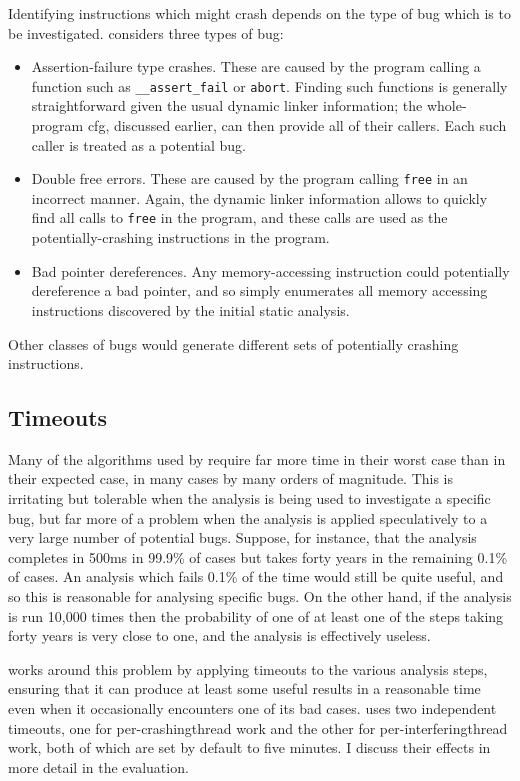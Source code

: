 Identifying instructions which might crash depends on the type of bug
which is to be investigated.  {\Implementation} considers three types
of bug:
\begin{itemize}
\item Assertion-failure type crashes.  These are caused by the program
  calling a function such as \verb|__assert_fail| or \verb|abort|.
  Finding such functions is generally straightforward given the usual
  dynamic linker information; the whole-program \gls{cfg}, discussed
  earlier, can then provide all of their callers.  Each such caller is
  treated as a potential bug.
\item Double free errors.  These are caused by the program calling
  \verb|free| in an incorrect manner.  Again, the dynamic linker
  information allows {\implementation} to quickly find all calls to
  \verb|free| in the program, and these calls are used as the
  potentially-crashing instructions in the program.
\item Bad pointer dereferences.  Any memory-accessing instruction
  could potentially dereference a bad pointer, and so
  {\implementation} simply enumerates all memory accessing
  instructions discovered by the initial static analysis.
\end{itemize}
Other classes of bugs would generate different sets of potentially
crashing instructions.

\subsection{Timeouts}

Many of the algorithms used by {\technique} require far more time in
their worst case than in their expected case, in many cases by many
orders of magnitude.  This is irritating but tolerable when the
analysis is being used to investigate a specific bug, but far more of
a problem when the analysis is applied speculatively to a very large
number of potential bugs.  Suppose, for instance, that the analysis
completes in 500ms in 99.9\% of cases but takes forty years in the
remaining 0.1\% of cases.  An analysis which fails 0.1\% of the time
would still be quite useful, and so this is reasonable for analysing
specific bugs.  On the other hand, if the analysis is run 10,000 times
then the probability of one of at least one of the steps taking forty
years is very close to one, and the analysis is effectively useless.

{\Technique} works around this problem by applying timeouts to the
various analysis steps, ensuring that it can produce at least some
useful results in a reasonable time even when it occasionally
encounters one of its bad cases.  {\Implementation} uses two
independent timeouts, one for per-\gls{crashingthread} work and the
other for per-\gls{interferingthread} work, both of which are set by
default to five minutes.  I discuss their effects in more detail in
the evaluation.

